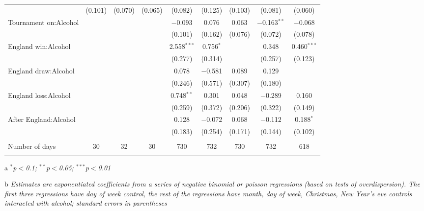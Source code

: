 \documentclass[12pt, a4paper]{article}
\begin{document}
\begin{sidewaystable}[htp]
{\begin{threeparttable}
\begin{tabular}{@{\extracolsep{5pt}}lcccccccc}
  & (0.101) & (0.070) & (0.065) & (0.082) & (0.125) & (0.103) & (0.081) & (0.060) \\ 
  Tournament on:Alcohol &  &  &  & $-$0.093 & 0.076 & 0.063 & $-$0.163$^{**}$ & $-$0.068 \\ 
  &  &  &  & (0.101) & (0.162) & (0.076) & (0.072) & (0.078) \\ 
  England win:Alcohol &  &  &  & 2.558$^{***}$ & 0.756$^{*}$ &  & 0.348 & 0.460$^{***}$ \\ 
  &  &  &  & (0.277) & (0.314) &  & (0.257) & (0.123) \\ 
  England draw:Alcohol &  &  &  & 0.078 & $-$0.581 & 0.089 & 0.129 &  \\ 
  &  &  &  & (0.246) & (0.571) & (0.307) & (0.180) &  \\ 
  England loss:Alcohol &  &  &  & 0.748$^{**}$ & 0.301 & 0.048 & $-$0.289 & 0.160 \\ 
  &  &  &  & (0.259) & (0.372) & (0.206) & (0.322) & (0.149) \\ 
  After England:Alcohol &  &  &  & 0.128 & $-$0.072 & 0.068 & $-$0.112 & 0.188$^{*}$ \\ 
  &  &  &  & (0.183) & (0.254) & (0.171) & (0.144) & (0.102) \\ 
 \hline \\[-1.8ex] 
Number of days & 30 & 32 & 30 & 730 & 732 & 730 & 732 & 618 \\ 
\hline 
\hline \\[-1.8ex] 
\end{tabular} 
\begin{tablenotes}
      \item[a] \textit{$^{*}$p$<$0.1; $^{**}$p$<$0.05; $^{***}$p$<$0.01}
      \item[b] \textit{Estimates are exponentiated coefficients from a series of negative binomial or poisson regressions (based on tests of overdispersion). The first three regressions have day of week control, the rest of the regressions have month, day of week, Christmas, New Year's eve controls interacted with alcohol; standard errors in parentheses}
    \end{tablenotes}
\end{threeparttable} }
\end{sidewaystable}
\end{document}
